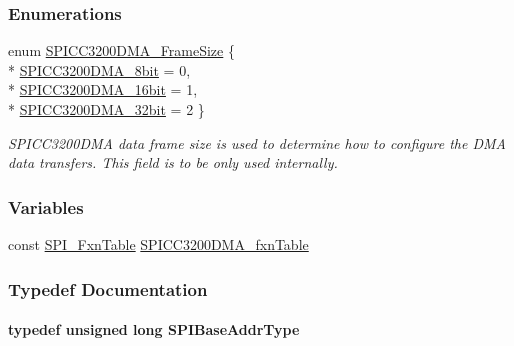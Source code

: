 \subsubsection*{Enumerations}
\begin{DoxyCompactItemize}
\item 
enum \hyperlink{_s_p_i_c_c3200_d_m_a_8h_a886c3ca11a73823e4f3ab5eefc0fbebb}{S\+P\+I\+C\+C3200\+D\+M\+A\+\_\+\+Frame\+Size} \{ \\*
\hyperlink{_s_p_i_c_c3200_d_m_a_8h_a886c3ca11a73823e4f3ab5eefc0fbebba681b4f53a3f33707b0ca9138d8a88a4b}{S\+P\+I\+C\+C3200\+D\+M\+A\+\_\+8bit} = 0, 
\\*
\hyperlink{_s_p_i_c_c3200_d_m_a_8h_a886c3ca11a73823e4f3ab5eefc0fbebba4d692c2c948d075ba729709f430cf739}{S\+P\+I\+C\+C3200\+D\+M\+A\+\_\+16bit} = 1, 
\\*
\hyperlink{_s_p_i_c_c3200_d_m_a_8h_a886c3ca11a73823e4f3ab5eefc0fbebba228f6056a9f34595480faab1f2ed8123}{S\+P\+I\+C\+C3200\+D\+M\+A\+\_\+32bit} = 2
 \}
\begin{DoxyCompactList}\small\item\em S\+P\+I\+C\+C3200\+D\+M\+A data frame size is used to determine how to configure the D\+M\+A data transfers. This field is to be only used internally. \end{DoxyCompactList}\end{DoxyCompactItemize}
\subsubsection*{Variables}
\begin{DoxyCompactItemize}
\item 
const \hyperlink{struct_s_p_i___fxn_table}{S\+P\+I\+\_\+\+Fxn\+Table} \hyperlink{_s_p_i_c_c3200_d_m_a_8h_ae0c3b60cf8063a900d504e232dc18c3c}{S\+P\+I\+C\+C3200\+D\+M\+A\+\_\+fxn\+Table}
\end{DoxyCompactItemize}


\subsubsection{Typedef Documentation}
\paragraph[{S\+P\+I\+Base\+Addr\+Type}]{\setlength{\rightskip}{0pt plus 5cm}typedef unsigned long {\bf S\+P\+I\+Base\+Addr\+Type}}\label{_s_p_i_c_c3200_d_m_a_8h_a4b7e9f3739f6196bed13f9c3c549c96d}
